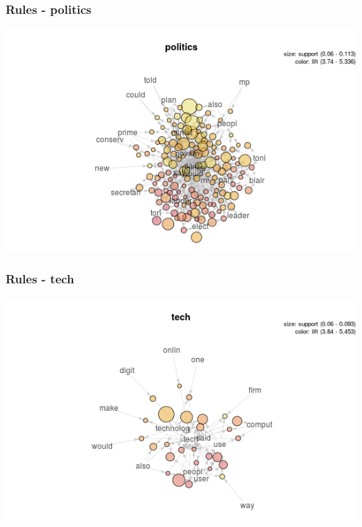 \documentclass{beamer}
\begin{document}
	\begin{frame}
			\frametitle{Rules - politics}
			\begin{center}
				\includegraphics[scale=0.55]{politics.png}
			\end{center}
	\end{frame}
	
	\begin{frame}
			\frametitle{Rules - tech}
			\begin{center}
				\includegraphics[scale=0.55]{tech.png}
			\end{center}
	\end{frame}
	
\end{document}
